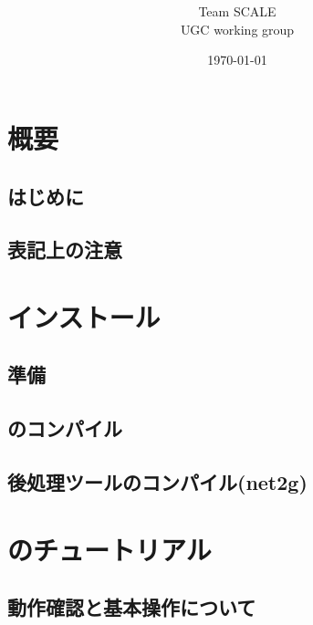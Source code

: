 \documentclass[a4paper]{jreport}
\title{{\vspace{2cm}{\Large Version \version} }}
\author{\Large Team SCALE\\ UGC working group}
\date{\today}
\begin{document}
\maketitle
\ClearWallPaper
{}
\tableofcontents


\part{概要} \label{part:overview}
 \chapter{はじめに} \label{sec:introduction}
 
 \chapter{表記上の注意} \label{sec:notation}
 

\part{インストール} \label{part:install}
 \chapter{準備}
 
 \chapter{\scalelib のコンパイル}
 
 \chapter{後処理ツールのコンパイル(net2g)}
 

\part{\scalerm のチュートリアル}
\chapter{動作確認と基本操作について} \label{chap:tutorial_ideal}




\end{document}
